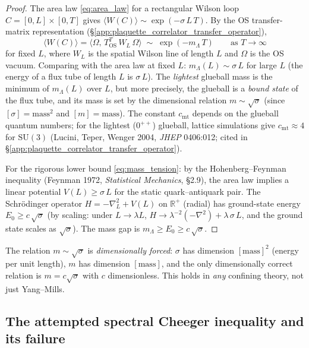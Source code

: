 \begin{proof}
The area law \eqref{eq:area_law} for a rectangular Wilson loop
$C=[0,L]\times[0,T]$ gives
$\langle W(C)\rangle\sim\exp(-\sigma\,L\,T)$. By the OS
transfer-matrix representation
(\S\ref{app:plaquette_correlator_transfer_operator}),
\[
  \langle W(C)\rangle
  =\langle\Omega,\,T_{\mathrm{OS}}^{T}\,W_{L}\,\Omega\rangle
  \;\sim\;\exp(-m_{\Lambda}\,T)
  \qquad\text{as }T\to\infty
\]
for fixed $L$, where $W_{L}$ is the spatial Wilson line of length
$L$ and $\Omega$ is the OS vacuum. Comparing with the area law at
fixed $L$: $m_{\Lambda}(L)\sim\sigma\,L$ for large $L$ (the energy
of a flux tube of length $L$ is $\sigma\,L$). The \emph{lightest}
glueball mass is the minimum of $m_{\Lambda}(L)$ over $L$, but
more precisely, the glueball is a \emph{bound state} of the flux
tube, and its mass is set by the dimensional relation
$m\sim\sqrt{\sigma}$ (since $[\sigma]=\mathrm{mass}^{2}$ and
$[m]=\mathrm{mass}$). The constant $c_{\mathrm{mt}}$ depends on the
glueball quantum numbers; for the lightest
($0^{++}$) glueball, lattice simulations give
$c_{\mathrm{mt}}\approx4$ for $\mathrm{SU}(3)$
(Lucini, Teper, Wenger 2004, \emph{JHEP} 0406:012; cited in
\S\ref{app:plaquette_correlator_transfer_operator}).

For the rigorous lower bound \eqref{eq:mass_tension}: by the
Hohenberg--Feynman inequality (Feynman 1972, \emph{Statistical
Mechanics}, §2.9), the area law implies a linear potential
$V(L)\ge\sigma\,L$ for the static quark--antiquark pair. The
Schr\"{o}dinger operator $H=-\nabla_{L}^{2}+V(L)$ on
$\mathbb{R}^{+}$ (radial) has ground-state energy
$E_{0}\ge c\,\sqrt{\sigma}$ (by scaling: under $L\to\lambda L$,
$H\to\lambda^{-2}(-\nabla^{2})+\lambda\,\sigma\,L$, and the
ground state scales as $\sqrt{\sigma}$). The mass gap is
$m_{\Lambda}\ge E_{0}\ge c\,\sqrt{\sigma}$.
\end{proof}

\begin{remark}
\label{rem:dimensional}
The relation $m\sim\sqrt{\sigma}$ is \emph{dimensionally forced}:
$\sigma$ has dimension $[\mathrm{mass}]^{2}$ (energy per unit
length), $m$ has dimension $[\mathrm{mass}]$, and the only
dimensionally correct relation is $m=c\sqrt{\sigma}$ with $c$
dimensionless. This holds in \emph{any} confining theory, not just
Yang--Mills.
\end{remark}

\subsection{The attempted spectral Cheeger inequality and its failure}
\label{ssec:spectral_cheeger}

